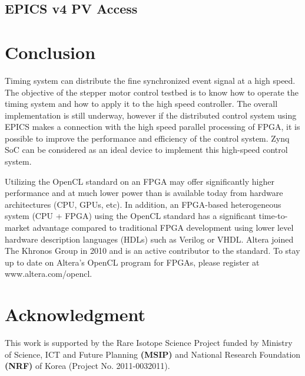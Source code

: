 \documentclass[journal]{IEEEtran}
\begin{document}
\subsection{EPICS v4 PV Access}

\newpage

\section{Conclusion}

Timing system can distribute the fine synchronized event signal at a high speed. The objective of the stepper motor control testbed is to know how to operate the timing system and how to apply it to the high speed controller. The overall implementation is still underway, however if the distributed control system using EPICS makes a connection with the high speed parallel processing of FPGA, it is possible to improve the performance and efficiency of the control system. Zynq SoC can be considered as an ideal device to implement this high-speed control system.

Utilizing the OpenCL standard on an FPGA may offer significantly higher performance and at much lower power than is available today from hardware architectures (CPU, GPUs, etc). In addition, an FPGA-based heterogeneous system (CPU + FPGA) using the OpenCL standard has a significant time-to-market advantage compared to traditional FPGA development using lower level hardware description languages (HDLs) such as Verilog or VHDL. Altera joined The Khronos Group in 2010 and is an active contributor to the standard. To stay up to date on Altera’s OpenCL program for FPGAs, please register at www.altera.com/opencl.

\section*{Acknowledgment}
This work is supported by the Rare Isotope Science Project funded by Ministry of Science, ICT and Future Planning \textbf{(MSIP)} and National Research Foundation \textbf{(NRF)} of Korea (Project No. 2011-0032011).
\end{document}
